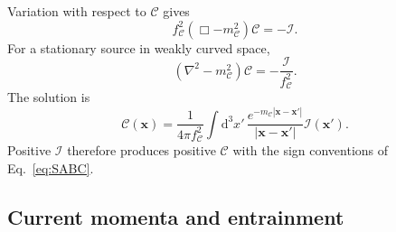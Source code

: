 \documentclass[11pt]{article}
\newcommand{\dd}{\mathrm{d}}
\begin{document}
Variation with respect to $\mathcal C$ gives
\begin{equation}
\boxed{
f_{\mathcal C}^2(\Box-m_{\mathcal C}^2)\mathcal C=-\mathcal I.
}
\label{eq:Ceom}
\end{equation}
For a stationary source in weakly curved space,
\begin{equation}
(\nabla^2-m_{\mathcal C}^2)\mathcal C
=-\frac{\mathcal I}{f_{\mathcal C}^2}.
\label{eq:Cstatic}
\end{equation}
The solution is
\begin{equation}
\mathcal C(\mathbf x)
=\frac{1}{4\pi f_{\mathcal C}^2}
\int \dd^3x'\,
\frac{e^{-m_{\mathcal C}|\mathbf x-\mathbf x'|}}
{|\mathbf x-\mathbf x'|}
\mathcal I(\mathbf x').
\label{eq:Yukawa}
\end{equation}
Positive $\mathcal I$ therefore produces positive $\mathcal C$ with the sign conventions of Eq.~\eqref{eq:SABC}.

\subsection{Current momenta and entrainment}
\end{document}
